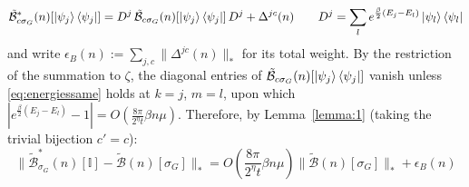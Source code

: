 \documentclass[aps,floatfix,10pt,amssymb,amsfont,amsmath,superscriptaddress,float,nofootinbib,longbibliography,nobalancelastpage,twocolumn]{revtex4-2}
\begin{document}
\begin{widetext}
\begin{equation}
    \tilde{\mathcal{B}}^*_{c\sigma_G}(n)[\ket{\psi_j}\bra{\psi_j}] = D^{j}\,\tilde{\mathcal{B}}_{c\sigma_G}(n)[\ket{\psi_j}\bra{\psi_j}]\,D^{j} + \Delta^{jc}(n) \qquad D^{j} = \sum_l e^{\frac{\beta}{2}(E_j-E_l)}\ket{\psi_l}\bra{\psi_l}
    \label{eq:Bsandwich}
\end{equation}
and write $\epsilon_B(n) := \sum_{j,c}\|\Delta^{jc}(n)\|_*$ for its total weight. By the restriction of the summation to $\zeta$, the diagonal entries of $\tilde{\mathcal{B}}_{c\sigma_G}(n)[\ket{\psi_j}\bra{\psi_j}]$ vanish unless \eqref{eq:energiessame} holds at $k=j$, $m=l$, upon which $|e^{\frac{\beta}{2}(E_j-E_l)}-1| = O(\frac{8\pi}{2^{\eta}t}\beta n\mu)$. Therefore, by Lemma~\ref{lemma:1} (taking the trivial bijection $c' = c$):
\begin{equation}
    \|\tilde{\mathcal{B}}^*_{\sigma_G}(n)[\mathbb{I}] - \tilde{\mathcal{B}}(n)[\sigma_G]\|_* = O\left(\frac{8\pi}{2^{\eta}t}\beta n\mu\right)\|\tilde{\mathcal{B}}(n)[\sigma_G]\|_* + \epsilon_B(n)
    \label{eq:Boutput}
\end{equation}


\end{widetext}
\end{document}
